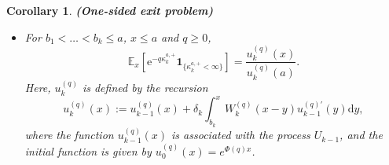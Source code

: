 \documentclass[12pt,reqno]{amsart}
\newcommand{\red}{\textcolor[rgb]{1.00,0.00,0.00}}
\newcommand{\blue}{\textcolor[rgb]{0.00,0.00,1.00}}
\newtheorem{corol}[theorem]{Corollary}
\theoremstyle{definition}
\theoremstyle{remark}
\newcommand{\e}{\mathbb{E}}
\newcommand{\ind}{\mathbf{1}}
\newcommand{\md}{\mathrm{d}}
\begin{document}
\begin{corol}{\textbf{(One-sided exit problem)}}
\begin{itemize}
	\item[(ii)]
	For $b_1<\dots <b_k\leq a$, $x \leq a$ and $q\geq 0$,
	\begin{equation}\label{main_onesided_up}
	\e_x \left[ \mathrm{e}^{-q \kappa_k^{a,+}} \ind_{\{\kappa_k^{a,+}<\infty\}} \right] =
	\frac{u^{(q)}_k(x)}{u^{(q)}_k(a)}.
	\end{equation}
	Here,
	$u^{(q)}_{k}$ is defined by the recursion
\begin{equation}\label{eq:mr.recursion_u_q}
	u^{(q)}_{k}(x) := u^{(q)}_{k-1}(x)+\delta_{k}\int^{x}_{b_{k}}W_k^{\left(q\right)}(x-y)u_{k-1}^{\left(q\right)\prime}(y)\md y,
	\end{equation}
	where the function $u^{(q)}_{k-1}(x)$ is associated with the process $U_{k-1}$, and the initial function is given by $u_{0}^{\left(q\right)}(x)=e^{\Phi(q)x }$. 

\end{itemize}
\end{corol}
\end{document}
